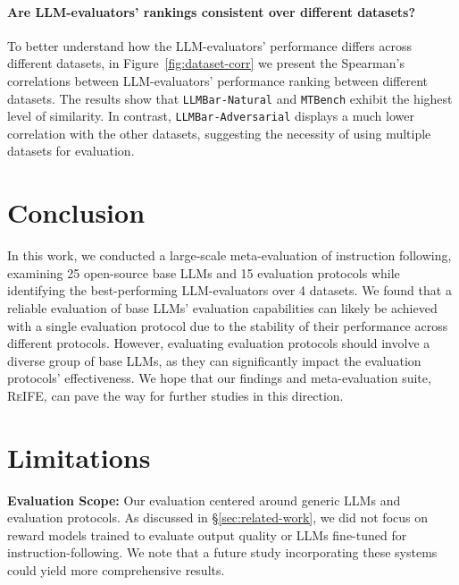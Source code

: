 \documentclass[11pt]{article}
\newcommand{\llmbarnatural}{\texttt{LLMBar-Natural}\xspace}
\newcommand{\adversarial}{\texttt{LLMBar-Adversarial}\xspace}
\newcommand{\mtbench}{\texttt{MTBench}\xspace}
\newcommand{\ours}{\textsc{ReIFE}\xspace}
\begin{document}
\paragraph{Are LLM-evaluators' rankings consistent over different datasets?}

To better understand how the LLM-evaluators' performance differs across different datasets, in Figure~\ref{fig:dataset-corr} we present the Spearman's correlations between LLM-evaluators' performance ranking between different datasets.
The results show that \llmbarnatural and \mtbench exhibit the highest level of similarity.
In contrast, \adversarial displays a much lower correlation with the other datasets, suggesting the necessity of using multiple datasets for evaluation.




% 

% 





\section{Conclusion}

In this work, we conducted a large-scale meta-evaluation of instruction following, examining 25 open-source base LLMs and 15 evaluation protocols while identifying the best-performing LLM-evaluators over 4 datasets.
We found that a reliable evaluation of base LLMs' evaluation capabilities can likely be achieved with a single evaluation protocol due to the stability of their performance across different protocols.
However, evaluating evaluation protocols should involve a diverse group of base LLMs, as they can significantly impact the evaluation protocols' effectiveness.
We hope that our findings and meta-evaluation suite, \ours, can pave the way for further studies in this direction.
% 

\section*{Limitations}

\noindent \textbf{Evaluation Scope:} 
Our evaluation centered around generic LLMs and evaluation protocols.
As discussed in \S\ref{sec:related-work}, we did not focus on reward models trained to evaluate output quality or LLMs fine-tuned for instruction-following. 
We note that a future study incorporating these systems could yield more comprehensive results.
\end{document}

